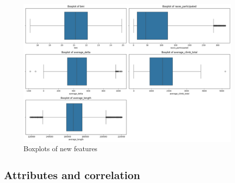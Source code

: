 \documentclass{article}
\begin{document}
\begin{figure}[H]
\centering
\includegraphics[width=1\linewidth]{boxplots.png}
\caption{\label{fig:boxplots}Boxplots of new features}
\end{figure}
    




\subsection{Attributes and correlation}
\end{document}
